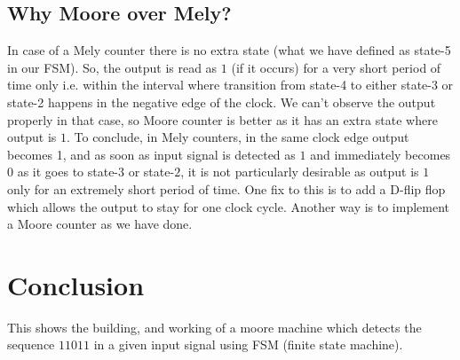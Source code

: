 \documentclass{article}
\begin{document}
\subsection{Why Moore over Mely?}
In case of a Mely counter there is no extra state (what we have defined as state-5 in our FSM). So, the output is read as $1$ (if it occurs) for a very short period of time only i.e. within the interval where transition from state-4 to either state-3 or state-2 happens in the negative edge of the clock. We can't observe the output properly in that case, so Moore counter is better as it has an extra state where output is $1$.  To conclude, in Mely counters,  in the same clock edge output becomes 1, and as soon as input signal is detected as $1$ and immediately becomes $0$ as it goes to state-$3$ or state-$2$, it is not particularly desirable as output is $1$ only for an extremely short period of time. One fix to this is to add a D-flip flop which allows the output to stay for one clock cycle. Another way is to implement a Moore counter as we have done.
\section{Conclusion}
This shows the building, and working of a moore machine which detects the sequence $11011$ in a given input signal using FSM (finite state machine).
\end{document}
